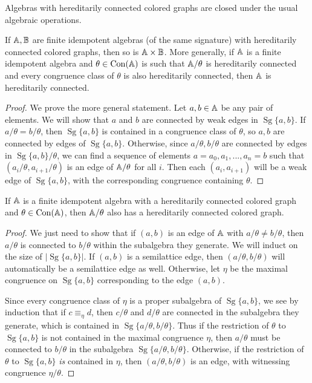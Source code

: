 \documentclass[letterpaper,11pt]{article}
\DeclareMathOperator{\Sg}{Sg}
\DeclareMathOperator{\Con}{Con}
\begin{document}
Algebras with hereditarily connected colored graphs are closed under the usual algebraic operations.

\begin{prop}\label{hereditarily-connected-product} If $\mathbb{A}, \mathbb{B}$ are finite idempotent algebras (of the same signature) with hereditarily connected colored graphs, then so is $\mathbb{A} \times \mathbb{B}$. More generally, if $\mathbb{A}$ is a finite idempotent algebra and $\theta \in \Con(\bA)$ is such that $\mathbb{A}/\theta$ is hereditarily connected and every congruence class of $\theta$ is also hereditarily connected, then $\mathbb{A}$ is hereditarily connected.
\end{prop}
\begin{proof} We prove the more general statement. Let $a,b \in \mathbb{A}$ be any pair of elements. We will show that $a$ and $b$ are connected by weak edges in $\Sg\{a,b\}$. If $a/\theta = b/\theta$, then $\Sg\{a,b\}$ is contained in a congruence class of $\theta$, so $a,b$ are connected by edges of $\Sg\{a,b\}$. Otherwise, since $a/\theta, b/\theta$ are connected by edges in $\Sg\{a,b\}/\theta$, we can find a sequence of elements $a = a_0, a_1, ..., a_n = b$ such that $(a_i/\theta,a_{i+1}/\theta)$ is an edge of $\mathbb{A}/\theta$ for all $i$. Then each $(a_i,a_{i+1})$ will be a weak edge of $\Sg\{a,b\}$, with the corresponding congruence containing $\theta$.
\end{proof}

\begin{prop} If $\mathbb{A}$ is a finite idempotent algebra with a hereditarily connected colored graph and $\theta \in \Con(\bA)$, then $\mathbb{A}/\theta$ also has a hereditarily connected colored graph.
\end{prop}
\begin{proof} We just need to show that if $(a,b)$ is an edge of $\mathbb{A}$ with $a/\theta \ne b/\theta$, then $a/\theta$ is connected to $b/\theta$ within the subalgebra they generate. We will induct on the size of $|\Sg\{a,b\}|$. If $(a,b)$ is a semilattice edge, then $(a/\theta,b/\theta)$ will automatically be a semilattice edge as well. Otherwise, let $\eta$ be the maximal congruence on $\Sg\{a,b\}$ corresponding to the edge $(a,b)$.

Since every congruence class of $\eta$ is a proper subalgebra of $\Sg\{a,b\}$, we see by induction that if $c \equiv_\eta d$, then $c/\theta$ and $d/\theta$ are connected in the subalgebra they generate, which is contained in $\Sg\{a/\theta,b/\theta\}$. Thus if the restriction of $\theta$ to $\Sg\{a,b\}$ is not contained in the maximal congruence $\eta$, then $a/\theta$ must be connected to $b/\theta$ in the subalgebra $\Sg\{a/\theta,b/\theta\}$. Otherwise, if the restriction of $\theta$ to $\Sg\{a,b\}$ \emph{is} contained in $\eta$, then $(a/\theta,b/\theta)$ is an edge, with witnessing congruence $\eta/\theta$.
\end{proof}
\end{document}
